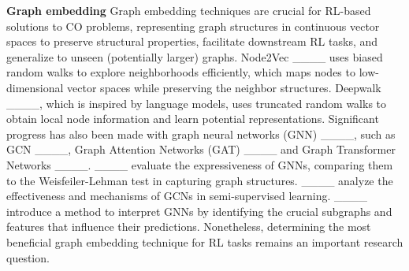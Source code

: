 \textbf{Graph embedding}\quad
Graph embedding techniques are crucial for RL-based solutions to CO problems, representing graph structures in continuous vector spaces to preserve structural properties, facilitate downstream RL tasks, and generalize to unseen (potentially larger) graphs. %
Node2Vec ____ uses biased random walks to explore neighborhoods efficiently, which maps nodes to low-dimensional vector spaces while preserving the neighbor structures.
Deepwalk ____, which is inspired by language models, uses truncated random walks to obtain local node information and learn potential representations. Significant progress has also been made with graph neural networks (GNN) ____, such as GCN ____, Graph Attention Networks (GAT) ____ and Graph Transformer Networks ____. ____ evaluate the expressiveness of GNNs, comparing them to the Weisfeiler-Lehman test in capturing graph structures. ____ analyze the effectiveness and mechanisms of GCNs in semi-supervised learning. ____ introduce a method to interpret GNNs by identifying the crucial subgraphs and features that influence their predictions.
Nonetheless, determining the most beneficial graph embedding technique for RL tasks remains an important research question.

